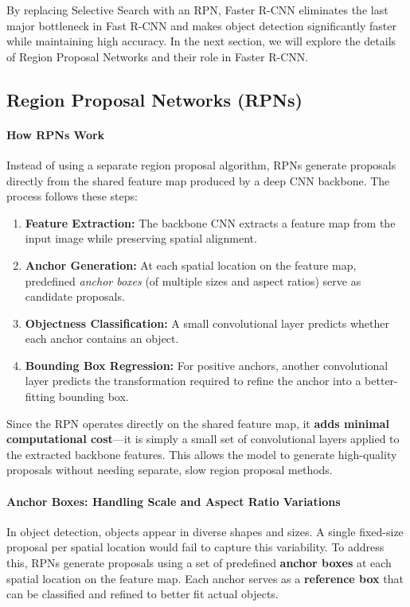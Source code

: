 By replacing Selective Search with an RPN, Faster R-CNN eliminates the last major bottleneck in Fast R-CNN and makes object detection significantly faster while maintaining high accuracy. In the next section, we will explore the details of Region Proposal Networks and their role in Faster R-CNN.

\subsection{Region Proposal Networks (RPNs)}
\label{subsec:chapter14_rpn}

\paragraph{\textbf{How RPNs Work}} 
Instead of using a separate region proposal algorithm, RPNs generate proposals directly from the shared feature map produced by a deep CNN backbone. The process follows these steps:

\begin{enumerate}
    \item \textbf{Feature Extraction:} The backbone CNN extracts a feature map from the input image while preserving spatial alignment.
    \item \textbf{Anchor Generation:} At each spatial location on the feature map, predefined \textit{anchor boxes} (of multiple sizes and aspect ratios) serve as candidate proposals.
    \item \textbf{Objectness Classification:} A small convolutional layer predicts whether each anchor contains an object.
    \item \textbf{Bounding Box Regression:} For positive anchors, another convolutional layer predicts the transformation required to refine the anchor into a better-fitting bounding box.
\end{enumerate}

Since the RPN operates directly on the shared feature map, it \textbf{adds minimal computational cost}—it is simply a small set of convolutional layers applied to the extracted backbone features. This allows the model to generate high-quality proposals without needing separate, slow region proposal methods.

\paragraph{\textbf{Anchor Boxes: Handling Scale and Aspect Ratio Variations}}  
In object detection, objects appear in diverse shapes and sizes. A single fixed-size proposal per spatial location would fail to capture this variability. To address this, RPNs generate proposals using a set of predefined \textbf{anchor boxes} at each spatial location on the feature map. Each anchor serves as a \textbf{reference box} that can be classified and refined to better fit actual objects.  

